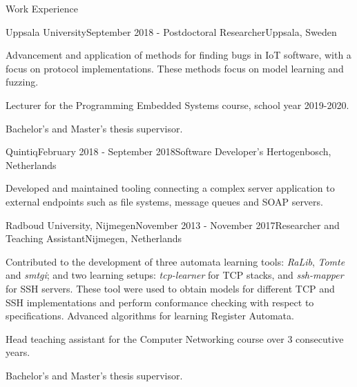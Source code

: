 \documentclass{resume} %
\newcommand{\plang}[1]{$($#1$)$}
\renewcommand{\plang}[1]{}
\begin{document}

\begin{rSection}{Work Experience}

\item \begin{rSubsection}{Uppsala University}{September 2018 - }{Postdoctoral Researcher}{Uppsala, Sweden}
\item Advancement and application of methods for finding bugs in IoT software, with a focus on protocol implementations. These methods focus on model learning and fuzzing. 
\item Lecturer for the Programming Embedded Systems course, school year 2019-2020.
\item Bachelor's and Master's thesis supervisor. 
\end{rSubsection}

\item \begin{rSubsection}{Quintiq}{February 2018 - September 2018}{Software Developer}{'s Hertogenbosch, Netherlands}
\item Developed and maintained tooling connecting a complex server application to external endpoints such as file systems, message queues and SOAP servers. 
\end{rSubsection}

\item \begin{rSubsection}{Radboud University, Nijmegen}{November 2013 - November 2017}{Researcher and Teaching Assistant}{Nijmegen, Netherlands}
\item Contributed to the development of three automata learning tools: \emph{RaLib}\plang{Java}, \emph{Tomte}\plang{Java, Python} and \emph{smtgi}\plang{Python}; and
two learning setups: \emph{tcp-learner}\plang{Java, Python} for TCP stacks, and \emph{ssh-mapper}\plang{Java, Python} for SSH servers. These tool were used to obtain models for different TCP and SSH implementations and perform conformance checking with respect to specifications. Advanced algorithms for learning Register Automata.
\item Head teaching assistant for the Computer Networking course over 3 consecutive years. %
\item Bachelor's and Master's thesis supervisor. 
\end{rSubsection}



\end{rSection}
\end{document}

